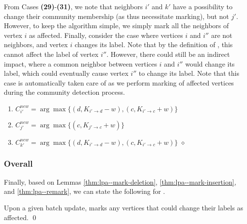 From Cases \textbf{(29)}-\textbf{(31)}, we note that neighbors $i'$ and $k'$ have a possibility to change their community membership (as thus necessitate marking), but not $j'$. However, to keep the algorithm simple, we simply mark all the neighbors of vertex $i$ as affected. Finally, consider the case where vertices $i$ and $i''$ are not neighbors, and vertex $i$ changes its label. Note that by the definition of \LPA{}, this cannot affect the label of vertex $i''$. However, there could still be an indirect impact, where a common neighbor between vertices $i$ and $i''$ would change its label, which could eventually cause vertex $i''$ to change its label. Note that this case is automatically taken care of as we perform marking of affected vertices during the community detection process.

\begin{enumerate}[start=29]
  \item $C_{i'}^{new} = \arg\max \{ (d, K_{i' \rightarrow d} - w), (c, K_{i' \rightarrow c} + w) \}$
  \item $C_{j'}^{new} = \arg\max \{ (c, K_{j' \rightarrow c} + w) \}$
  \item $C_{k'}^{new} = \arg\max \{ (d, K_{i' \rightarrow d} - w), (c, K_{i' \rightarrow c} + w) \}$ \hfill $\diamond$
\end{enumerate}




\subsubsection{Overall}

Finally, based on Lemmas \ref{thm:lpa--mark-deletion}, \ref{thm:lpa--mark-insertion}, and \ref{thm:lpa--remark}, we can state the following for \FroLPA{}.

\begin{theorem}
\label{thm:lpa}
Upon a given batch update, \FroLPA{} marks any vertices that could change their labels as affected. \qed
\end{theorem}
